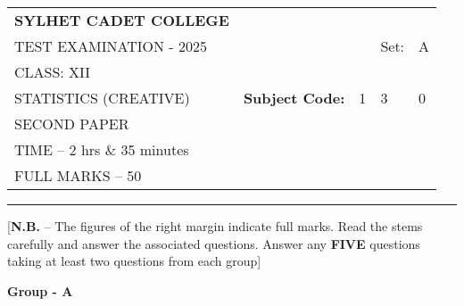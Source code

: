 \documentclass{article}
\begin{document}
\begin{table}[h]
\centering
\begin{tabular}{lllll}
\textbf{\large SYLHET CADET COLLEGE} &  &  &  &  \\ \cline{4-5} 
TEST EXAMINATION - 2025 &  & \multicolumn{1}{l|}{} & \multicolumn{1}{l|}{Set:} & \multicolumn{1}{l|}{A} \\ \cline{4-5} 
CLASS: XII &  &  &  &  \\ \cline{3-5} 
STATISTICS (CREATIVE)& \multicolumn{1}{l|}{\textbf{Subject Code:}} & \multicolumn{1}{l|}{1} & \multicolumn{1}{l|}{3} & \multicolumn{1}{l|}{0} \\ \cline{3-5} 
 SECOND PAPER &  &  &  &  \\
TIME – 2 hrs \& 35 minutes &  &  &  &  \\
FULL MARKS – 50 &  &  &  & 
\end{tabular}
\end{table}

\hrule

\begin{center}
[\textbf{N.B.} – The figures of the right margin indicate full marks. Read the stems carefully and answer the associated questions. Answer any \textbf{FIVE} questions taking at least two questions from each group]\\
\end{center}

\begin{center}
\textbf{Group  - A}
\end{center}
\end{document}
